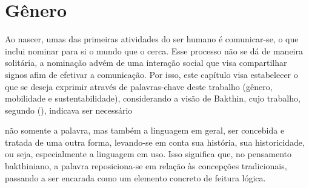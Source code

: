 

\section{Gênero}

Ao nascer, umas das primeiras atividades do ser humano é comunicar-se, o que inclui nominar para si o mundo que o cerca. Esse processo não se dá de maneira solitária, a nominação advém de uma interação social que visa compartilhar signos afim de efetivar a comunicação. Por isso, este capítulo visa estabelecer o que se deseja exprimir através de palavras-chave deste trabalho (gênero, mobilidade e sustentabilidade), considerando a visão de Bakthin, cujo trabalho, segundo  (\citeyear{STELLA2005}), indicava ser necessário

\begin{citacao}
não somente a palavra, mas também a linguagem em geral, ser concebida e tratada de uma outra forma, levando-se em conta sua história, sua historicidade, ou seja, especialmente a linguagem em uso. Isso significa que, no pensamento bakthiniano, a palavra reposiciona-se em relação às concepções tradicionais, passando a ser encarada como um elemento concreto de feitura lógica.
\end{citacao}

